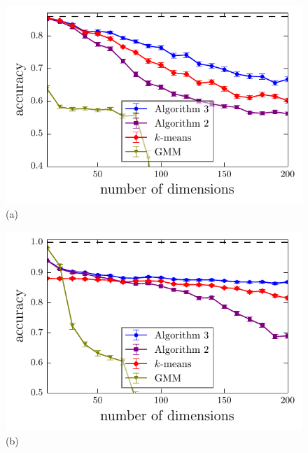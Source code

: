\documentclass[aps,preprint,nofootinbib,floatfix]{revtex4-1}
\begin{document}

\begin{figure}
\begin{minipage}{0.49\textwidth}
\includegraphics[width=1\textwidth]{gauss_dim.pdf}\\[-1.0em] (a)
\end{minipage}
\begin{minipage}{0.49\textwidth}
\includegraphics[width=1\textwidth]{gauss_cov_squareroot.pdf}\\[-1.0em] (b)
\end{minipage}

\end{figure}
\end{document}
